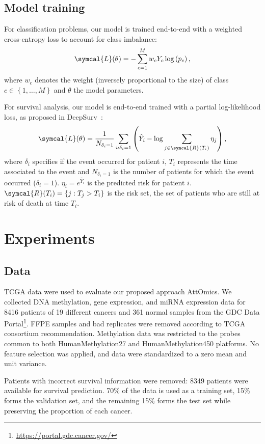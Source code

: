 \documentclass[../main.tex]{subfiles}
\begin{document}
	\subsection{Model training}

	    For classification problems, our model is trained end-to-end with a weighted cross-entropy loss to account for class imbalance:
	    \[ \symcal{L}(\theta) = - \sum_{c=1}^{M}w_c Y_c \log\left( p_c\right) \text{,}\]
	    where \(w_c\) denotes the weight (inversely proportional to the size) of class \(c \in \left\{1, \ldots,M \right\}\) and \(\theta\) the model parameters.

	    For survival analysis, our model is end-to-end trained with a partial log-likelihood loss, as proposed in DeepSurv~\cite{katzmanDeepSurvPersonalizedTreatment2018}:
	    \[ \symcal{L}(\theta) = \frac{1}{N_{\delta_i = 1}} \sum_{i:\delta_i=1} \left(\hat{Y}_i - \log \sum_{j \in \symcal{R}(T_i)}\eta_j \right) \text{,}\]
	    where \(\delta_i\) specifies if the event occurred for patient \(i\), \(T_i\) represents the time associated to the event and \(N_{\delta_i = 1}\) is the number of patients for which the event occurred (\(\delta_i = 1\)).
	    \(\eta_i = e^{\hat{Y}_i}\) is the predicted risk for patient \(i\).
	    \(\symcal{R}(T_i) = \{j: T_j > T_i\}\) is the risk set, the set of patients who are still at risk of death at time \(T_i\).

\section{Experiments}
	\subsection{Data}

	    TCGA data were used to evaluate our proposed approach AttOmics.
	    We collected DNA methylation, gene expression, and miRNA expression data for 8416 patients of 19 different cancers and 361 normal samples from the GDC Data Portal\footnote{\url{https://portal.gdc.cancer.gov/}}.
	    FFPE samples and bad replicates were removed according to TCGA consortium recommendation.
	    Methylation data was restricted to the probes common to both HumanMethylation27 and HumanMethylation450 platforms.
	    No feature selection was applied, and data were standardized to a zero mean and unit variance.

	    Patients with incorrect survival information were removed: 8349 patients were available for survival prediction.
	    70\% of the data is used as a training set, 15\% forms the validation set, and the remaining 15\% forms the test set while preserving the proportion of each cancer.
\end{document}
